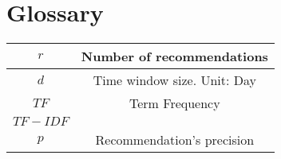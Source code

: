 \newpage
\chapter{Glossary}
\begin{tabular}{|c|c|}
	\hline $ r $ & Number of recommendations \\ 
	\hline $ d $ & Time window size. Unit: Day \\ 
	\hline $ TF $ & Term Frequency \\ 
	\hline $ TF-IDF $ &  \\ 
	\hline $ p $ & Recommendation's precision \\ 
	\hline 
\end{tabular} 

